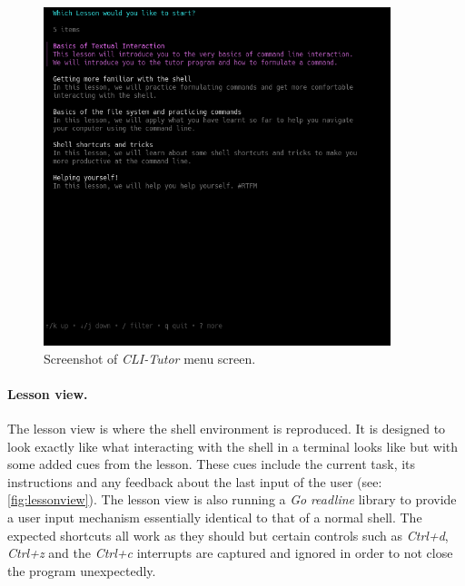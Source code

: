 \begin{figure}[htbp]
	\centering
	\includegraphics[width=0.9\textwidth]{img/menushort}
	\caption{Screenshot of \textit{CLI-Tutor} menu screen.}
	\label{fig:clitutormenu}
\end{figure}


\paragraph{Lesson view.} The lesson view is where the shell environment is
reproduced. It is designed to look exactly like what interacting with the shell
in a terminal looks like but with some added cues from the lesson. These cues
include the current task, its instructions and any feedback about the last
input of the user (see: \autoref{fig:lessonview}). The lesson view is also
running a \textit{Go} \textit{readline} library to provide a user input
mechanism essentially identical to that of a normal shell. The expected
shortcuts all work as they should but certain controls such as \textit{Ctrl+d},
\textit{Ctrl+z} and the \textit{Ctrl+c} interrupts are captured and ignored in
order to not close the program unexpectedly.

